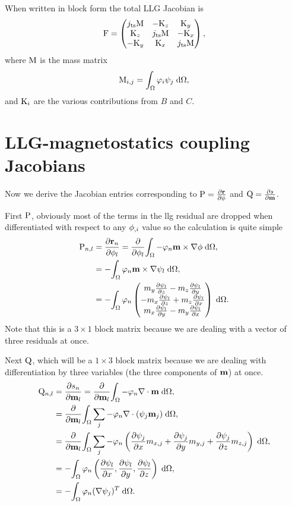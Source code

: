 When written in block form the total LLG Jacobian is
\begin{equation}
  \mathrm{F} =
  \begin{pmatrix}
    j_\text{ts} \mathrm{M}    & -\mathrm{K}_z       & \mathrm{K}_y \\
    \mathrm{K}_z         & j_\text{ts}\mathrm{M}    & -\mathrm{K}_x \\
    -\mathrm{K}_y        & \mathrm{K}_x        & j_\text{ts} \mathrm{M}
  \end{pmatrix}, 
\end{equation}
where $\mathrm{M}$ is the mass matrix
\begin{equation}
  \label{eq:mass-matrix}
  \mathrm{M}_{i,j} = {\int_{\Omega} \varphi_i \psi_j {\; \text{d}} {\Omega}},
\end{equation}
and $\mathrm{K}_i$ are the various contributions from $B$ and $C$.

\section{LLG-magnetostatics coupling Jacobians}
\label{sec:llg-magn-coupl}

Now we derive the Jacobian entries corresponding to $\mathrm{P} = \frac{\partial \mathbf{r}}{\partial \phi}$ and $\mathrm{Q} = \frac{\partial s}{\partial \mathbf{m}}$.

First $\mathrm{P}$, obviously most of the terms in the llg residual are dropped when differentiated with respect to any $\phi_{,i}$ value so the calculation is quite simple
\begin{equation}
  \begin{aligned}
    \mathrm{P}_{n,l} &= \frac{\partial \mathbf{r}_n}{\partial \phi_l} 
    = \frac{\partial }{\partial \phi_l} {\int_{\Omega}  -\varphi_n \mathbf{m} \times \nabla \phi {\; \text{d}} {\Omega}}, \\
    &= -{\int_{\Omega}  \varphi_n \mathbf{m} \times \nabla \psi_l {\; \text{d}} {\Omega}}, \\
    &= -{\int_{\Omega}  \varphi_n \begin{pmatrix} m_y\frac{\partial \psi_l}{\partial z} - m_z \frac{\partial \psi_l}{\partial y} \\ -m_x\frac{\partial \psi_l}{\partial z} + m_z \frac{\partial \psi_l}{\partial x} \\ m_x\frac{\partial \psi_l}{\partial y} - m_y \frac{\partial \psi_l}{\partial x} \end{pmatrix} {\; \text{d}} {\Omega}}.
  \end{aligned}
\end{equation}
Note that this is a $3 \times 1$ block matrix because we are dealing with a vector of three residuals at once.

Next $\mathrm{Q}$, which will be a $1 \times 3$ block matrix because we are dealing with differentiation by three variables (the three components of $\mathbf{m}$) at once.
\begin{equation}
  \begin{aligned}
    \mathrm{Q}_{n,l} &= \frac{\partial s_n}{\partial \mathbf{m}_l} = \frac{\partial }{\partial \mathbf{m}_l} {\int_{\Omega}  -\varphi_n \nabla \cdot \mathbf{m} {\; \text{d}} {\Omega}}, \\
    &= \frac{\partial }{\partial \mathbf{m}_l} {\int_{\Omega}  \sum_j -\varphi_n \nabla \cdot (\psi_j \mathbf{m}_j) {\; \text{d}} {\Omega}}, \\
    &= \frac{\partial }{\partial \mathbf{m}_l} {\int_{\Omega}  \sum_j -\varphi_n \left( \frac{\partial \psi_j}{\partial x} m_{x,j} 
        + \frac{\partial \psi_j}{\partial y} m_{y,j} + \frac{\partial \psi_j}{\partial z} m_{z,j} \right)  {\; \text{d}} {\Omega}}, \\
    &= -{\int_{\Omega}  \varphi_n \left( \frac{\partial \psi_l}{\partial x}, 
        \frac{\partial \psi_l}{\partial y}, \frac{\partial \psi_l}{\partial z} \right)  {\; \text{d}} {\Omega}}, \\
    &= -{\int_{\Omega} \varphi_n (\nabla \psi_j)^T {\; \text{d}} {\Omega}}.
  \end{aligned}
\end{equation}

